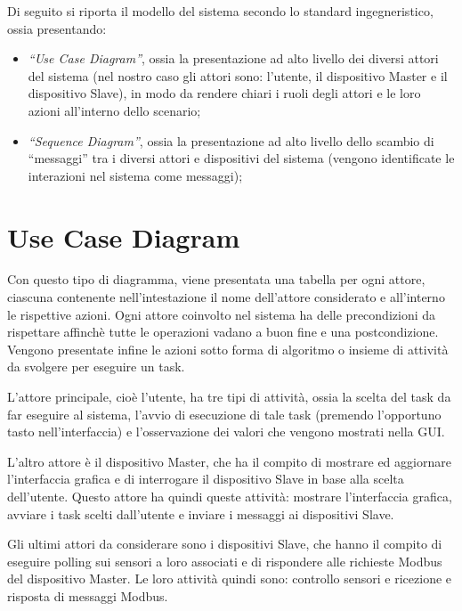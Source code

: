 \documentclass[a4paper,titlepage]{book}
\begin{document}
Di seguito si riporta il modello del sistema secondo lo standard ingegneristico, ossia presentando:
\begin{itemize}[noitemsep,topsep=23pt,parsep=23pt,partopsep=0pt]

\item\textit{``Use Case Diagram''}, ossia la presentazione ad alto livello dei diversi attori del sistema (nel nostro caso gli attori sono: l'utente, il dispositivo Master e il dispositivo Slave), in modo da rendere chiari i ruoli degli attori e le loro azioni all'interno dello scenario;
\item\textit{``Sequence Diagram''}, ossia la presentazione ad alto livello dello scambio di ``messaggi'' tra i diversi attori e dispositivi del sistema (vengono identificate le interazioni nel sistema come messaggi);

\end{itemize}

\newpage

\section{Use Case Diagram}

Con questo tipo di diagramma, viene presentata una tabella per ogni attore, ciascuna contenente nell'intestazione il nome dell'attore considerato e all'interno le rispettive azioni. Ogni attore coinvolto nel sistema ha delle precondizioni da rispettare affinchè tutte le operazioni vadano a buon fine e una postcondizione. Vengono presentate infine le azioni sotto forma di algoritmo o insieme di attività da svolgere per eseguire un task.

L'attore principale, cioè l'utente, ha tre tipi di attività, ossia la scelta del task da far eseguire al sistema, l'avvio di esecuzione di tale task (premendo l'opportuno tasto nell'interfaccia) e l'osservazione dei valori che vengono mostrati nella GUI.

L'altro attore è il dispositivo Master, che ha il compito di mostrare ed aggiornare l'interfaccia grafica e di interrogare il dispositivo Slave in base alla scelta dell'utente. Questo attore ha quindi queste attività: mostrare l'interfaccia grafica, avviare i task scelti dall'utente e inviare i messaggi ai dispositivi Slave.

Gli ultimi attori da considerare sono i dispositivi Slave, che hanno il compito di eseguire polling sui sensori a loro associati e di rispondere alle richieste Modbus del dispositivo Master. Le loro attività quindi sono: controllo sensori e ricezione e risposta di messaggi Modbus.
\end{document}
